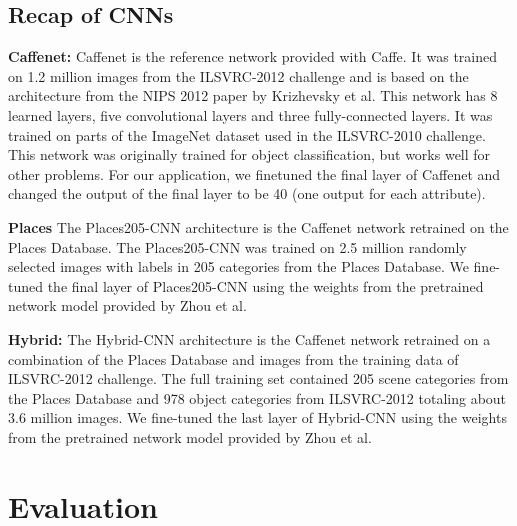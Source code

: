 \documentclass{article}
\newcommand{\todo}[1]{\textcolor{red}{todo: {\em #1}}}
\begin{document}
\subsection{Recap of CNNs}
\indent

\textbf{Caffenet:} Caffenet is the reference network provided with 
Caffe\cite{caffe14}.  It was trained on 1.2 million images from the 
ILSVRC-2012\cite{ILSVRCarxiv14} challenge and is based on the architecture from 
the NIPS 2012 paper by Krizhevsky\cite{caffenetnips12} et al.  This network has 
8 learned layers, five convolutional layers and three fully-connected layers.  
It was trained on parts of the ImageNet dataset used in the 
ILSVRC-2010\cite{ILSVRCarxiv14} challenge.  This network was originally trained 
for object classification, but works well for other problems. For our application, 
we finetuned the final layer of Caffenet and changed the output of the final 
layer to be 40 (one output for each attribute).

\textbf{Places} The Places205-CNN architecture is the Caffenet network retrained on 
the Places Database\cite{zhou2014places}.  The Places205-CNN was trained on 2.5
million randomly selected images with labels in 205 categories from the Places 
Database.  We fine-tuned the final layer of Places205-CNN using the weights from the
pretrained network model provided by Zhou\cite{zhou2014places} et al.

\textbf{Hybrid:} The Hybrid-CNN architecture is the Caffenet network retrained on
a combination of the Places Database\cite{zhou2014places} and images from the 
training data of ILSVRC-2012\cite{ILSVRCarxiv14} challenge.  The full training set
contained 205 scene categories from the Places Database and 978 object categories
from ILSVRC-2012 totaling about 3.6 million images.  We fine-tuned the last 
layer of Hybrid-CNN using the weights from the pretrained network model provided by 
Zhou\cite{zhou2014places} et al.




\section{Evaluation}
\end{document}
